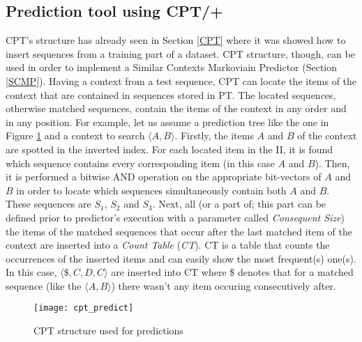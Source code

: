 \subsection{Prediction tool using CPT/+}{\label{cpt_pred}}
CPT's structure has already seen in Section \ref{CPT} where it was showed how to insert sequences from a training part of a dataset. CPT structure, though, can be used in order to implement a Similar Contexts Markoviain Predictor (Section \ref{SCMP}). Having a context from a test sequence, CPT can locate the items of the context that are contained in sequences stored in PT. The located sequences, otherwise matched sequences, contain the items of the context in any order and in any position. For example, let us assume a prediction tree like the one in Figure \ref{fig:cpt_predict} and a context to search $\langle A,B\rangle$. Firstly, the items $A$ and $B$ of the context are spotted in the inverted index. For each located item in the II, it is found which sequence contains every corresponding item (in this case $A$ and $B$). Then, it is performed a bitwise AND operation on the appropriate bit-vectors of $A$ and $B$ in order to locate which sequences simultaneously contain both $A$ and $B$. These sequences are $S_1$, $S_2$ and $S_3$. Next, all (or a part of; this part can be defined prior to predictor's execution with a parameter called \emph{Consequent Size}) the items of the matched sequences that occur after the last matched item of the context are inserted into a \emph{Count Table} (\emph{CT}). CT is a table that counts the occurrences of the inserted items and can easily show the most frequent(s) one(s). In this case, $\langle \$, C, D, C \rangle$ are inserted into CT where \$ denotes that for a matched sequence (like the $\langle A, B \rangle$) there wasn't any item occuring consecutively after. 

\begin{figure}[h]
    \centering
    \texttt{[image: cpt\_predict]}
    \caption{CPT structure used for predictions}
    \label{fig:cpt_predict}
\end{figure}

